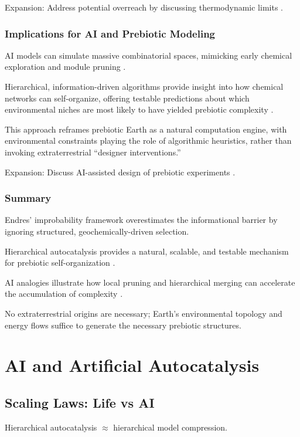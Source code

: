 \documentclass[openany]{book}
\begin{document}
Expansion: Address potential overreach by discussing thermodynamic limits \citep{england2015}.

\section{Implications for AI and Prebiotic Modeling}
AI models can simulate massive combinatorial spaces, mimicking early chemical exploration and module pruning \citep{scalinghypothesis}.

Hierarchical, information-driven algorithms provide insight into how chemical networks can self-organize, offering testable predictions about which environmental niches are most likely to have yielded prebiotic complexity \citep{peng2020}.

This approach reframes prebiotic Earth as a natural computation engine, with environmental constraints playing the role of algorithmic heuristics, rather than invoking extraterrestrial “designer interventions.”

Expansion: Discuss AI-assisted design of prebiotic experiments \citep{scalinghypothesis}.

\section{Summary}
Endres’ improbability framework overestimates the informational barrier by ignoring structured, geochemically-driven selection.

Hierarchical autocatalysis provides a natural, scalable, and testable mechanism for prebiotic self-organization \citep{hordijk2013}.

AI analogies illustrate how local pruning and hierarchical merging can accelerate the accumulation of complexity \citep{day2024}.

No extraterrestrial origins are necessary; Earth’s environmental topology and energy flows suffice to generate the necessary prebiotic structures.

\part{AI and Artificial Autocatalysis}

\chapter{Scaling Laws: Life vs AI}
Hierarchical autocatalysis $\approx$ hierarchical model compression.
\end{document}
